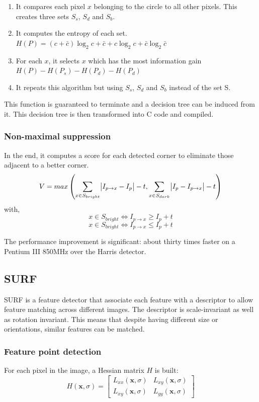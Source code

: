\documentclass[11pt]{report}
\begin{document}
\begin{enumerate}
	\item It compares each pixel $x$ belonging to the circle to all other pixels. This creates three sets $S_s$, $S_d$ and $S_b$.
	\item It computes the entropy of each set. $H(P) = (c + \bar{c})\log_2{c + \bar{c}} + c\log_2{c} + \bar{c}\log_2{\bar{c}}$
	\item For each $x$, it selects $x$ which has the most information gain $H(P) - H(P_s) - H(P_d) - H(P_d)$
	\item It repeats this algorithm but using $S_s$, $S_d$ and $S_b$ instead of the set S.
\end{enumerate}

This function is guaranteed to terminate and a decision tree can be induced from it. This decision tree is then transformed into C code and compiled.

\subsubsection{Non-maximal suppression}
In the end, it computes a score for each detected corner to eliminate those adjacent to a better corner.
\[
V = max \left(\sum_{x \in S_{bright}}{\abs{I_{p \rightarrow x} - I_p} - t},  \sum_{x \in S_{dark}}{\abs{I_p - I_{p \rightarrow x}} - t} \right)
\]
with,
\[
	x \in S_{bright} \Leftrightarrow  I_{p \rightarrow x} \geq I_p + t
\]
\[
	x \in S_{bright} \Leftrightarrow  I_{p \rightarrow x} \leq I_p + t
\]

The performance improvement is significant: about thirty times faster on a Pentium III 850MHz over the Harris detector.

\subsection{SURF}

SURF\cite{Surf06} is a feature detector that associate each feature with a descriptor to allow feature matching across different images. The descriptor is scale-invariant as well as rotation invariant. This means that despite having different size or orientations, similar features can be matched.

\subsubsection{Feature point detection}

 For each pixel in the image, a Hessian matrix $H$ is built: 
\[
  H(\mathbf{x}, \sigma) =
  \left [
  \begin{matrix}
    L_{xx}(\mathbf{x}, \sigma) & L_{xy}(\mathbf{x}, \sigma) \\
    L_{xy}(\mathbf{x}, \sigma) & L_{yy}(\mathbf{x}, \sigma)
  \end{matrix}
  \right ]
\]
\end{document}
